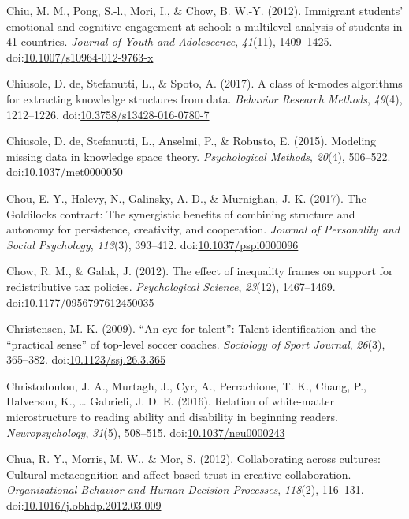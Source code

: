 \documentclass[english,man]{apa6}
\theoremstyle{definition}
\theoremstyle{definition}
\theoremstyle{definition}
\theoremstyle{remark}
\begin{document}
\hypertarget{ref-Chiu2012}{}
Chiu, M. M., Pong, S.-l., Mori, I., \& Chow, B. W.-Y. (2012). Immigrant
students' emotional and cognitive engagement at school: a multilevel
analysis of students in 41 countries. \emph{Journal of Youth and
Adolescence}, \emph{41}(11), 1409--1425.
doi:\href{https://doi.org/10.1007/s10964-012-9763-x}{10.1007/s10964-012-9763-x}

\hypertarget{ref-DeChiusole2016}{}
Chiusole, D. de, Stefanutti, L., \& Spoto, A. (2017). A class of k-modes
algorithms for extracting knowledge structures from data. \emph{Behavior
Research Methods}, \emph{49}(4), 1212--1226.
doi:\href{https://doi.org/10.3758/s13428-016-0780-7}{10.3758/s13428-016-0780-7}

\hypertarget{ref-Chiusole2015}{}
Chiusole, D. de, Stefanutti, L., Anselmi, P., \& Robusto, E. (2015).
Modeling missing data in knowledge space theory. \emph{Psychological
Methods}, \emph{20}(4), 506--522.
doi:\href{https://doi.org/10.1037/met0000050}{10.1037/met0000050}

\hypertarget{ref-Chou2017}{}
Chou, E. Y., Halevy, N., Galinsky, A. D., \& Murnighan, J. K. (2017).
The Goldilocks contract: The synergistic benefits of combining structure
and autonomy for persistence, creativity, and cooperation. \emph{Journal
of Personality and Social Psychology}, \emph{113}(3), 393--412.
doi:\href{https://doi.org/10.1037/pspi0000096}{10.1037/pspi0000096}

\hypertarget{ref-Chow2012}{}
Chow, R. M., \& Galak, J. (2012). The effect of inequality frames on
support for redistributive tax policies. \emph{Psychological Science},
\emph{23}(12), 1467--1469.
doi:\href{https://doi.org/10.1177/0956797612450035}{10.1177/0956797612450035}

\hypertarget{ref-Christensen2009}{}
Christensen, M. K. (2009). ``An eye for talent'': Talent identification
and the ``practical sense'' of top-level soccer coaches. \emph{Sociology
of Sport Journal}, \emph{26}(3), 365--382.
doi:\href{https://doi.org/10.1123/ssj.26.3.365}{10.1123/ssj.26.3.365}

\hypertarget{ref-Christodoulou2016}{}
Christodoulou, J. A., Murtagh, J., Cyr, A., Perrachione, T. K., Chang,
P., Halverson, K., \ldots{} Gabrieli, J. D. E. (2016). Relation of
white-matter microstructure to reading ability and disability in
beginning readers. \emph{Neuropsychology}, \emph{31}(5), 508--515.
doi:\href{https://doi.org/10.1037/neu0000243}{10.1037/neu0000243}

\hypertarget{ref-Chua2012}{}
Chua, R. Y., Morris, M. W., \& Mor, S. (2012). Collaborating across
cultures: Cultural metacognition and affect-based trust in creative
collaboration. \emph{Organizational Behavior and Human Decision
Processes}, \emph{118}(2), 116--131.
doi:\href{https://doi.org/10.1016/j.obhdp.2012.03.009}{10.1016/j.obhdp.2012.03.009}
\end{document}
